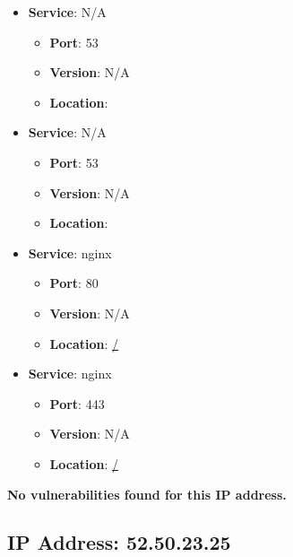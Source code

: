 \documentclass{article}
\begin{document}
\begin{itemize}
    
        \item \textbf{Service}: N/A
        \begin{itemize}
            \item \textbf{Port}: 53
            \item \textbf{Version}:  N/A 
            \item \textbf{Location}: \href{  }{  }
        \end{itemize}
    
        \item \textbf{Service}: N/A
        \begin{itemize}
            \item \textbf{Port}: 53
            \item \textbf{Version}:  N/A 
            \item \textbf{Location}: \href{  }{  }
        \end{itemize}
    
        \item \textbf{Service}: nginx
        \begin{itemize}
            \item \textbf{Port}: 80
            \item \textbf{Version}:  N/A 
            \item \textbf{Location}: \href{ / }{ / }
        \end{itemize}
    
        \item \textbf{Service}: nginx
        \begin{itemize}
            \item \textbf{Port}: 443
            \item \textbf{Version}:  N/A 
            \item \textbf{Location}: \href{ / }{ / }
        \end{itemize}
    
\end{itemize}


\textbf{No vulnerabilities found for this IP address.}




\clearpage



\subsection{IP Address: 52.50.23.25}
\end{document}
